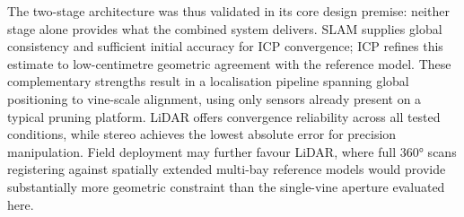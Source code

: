 The two-stage architecture was thus validated in its core design premise: neither stage alone provides what the combined system delivers. SLAM supplies global consistency and sufficient initial accuracy for ICP convergence; ICP refines this estimate to low-centimetre geometric agreement with the reference model. These complementary strengths result in a localisation pipeline spanning global positioning to vine-scale alignment, using only sensors already present on a typical pruning platform. LiDAR offers convergence reliability across all tested conditions, while stereo achieves the lowest absolute error for precision manipulation. Field deployment may further favour LiDAR, where full 360° scans registering against spatially extended multi-bay reference models would provide substantially more geometric constraint than the single-vine aperture evaluated here.



